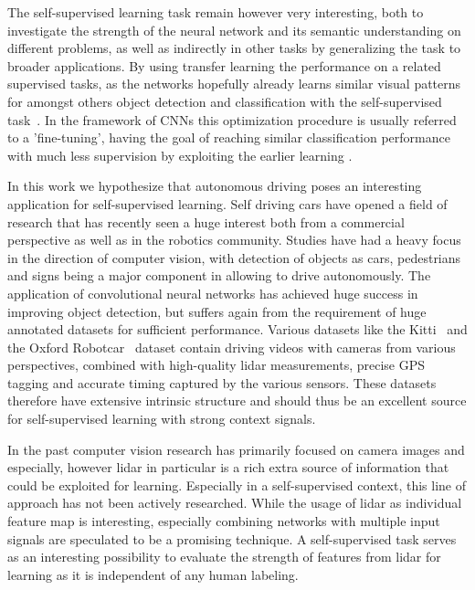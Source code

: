 The self-supervised learning task remain however very interesting, both to investigate the strength of the neural network and its semantic understanding on different problems, as well as indirectly in other tasks by generalizing the task to broader applications. By using transfer learning the performance on a related supervised tasks, as the networks hopefully already learns similar visual patterns for amongst others object detection and classification with the self-supervised task~\cite{raina2007}. In the framework of CNNs this optimization procedure is usually referred to a 'fine-tuning', having the goal of reaching similar classification performance with much less supervision by exploiting the earlier learning \needref.

In this work we hypothesize that autonomous driving poses an interesting application for self-supervised learning. Self driving cars have opened a field of research that has recently seen a huge interest both from a commercial perspective as well as in the robotics community. Studies have had a heavy focus in the direction of computer vision, with detection of objects as cars, pedestrians and signs being a major component in allowing to drive autonomously. The application of convolutional neural networks has achieved huge success in improving object detection\cite{bojarski2016end}, but suffers again from the requirement of huge annotated datasets for sufficient performance. Various datasets like the Kitti~\cite{geiger2012} and the Oxford Robotcar~\cite{maddern2017} dataset contain driving videos with cameras from various perspectives, combined with high-quality lidar measurements, precise GPS tagging and accurate timing captured by the various sensors. These datasets therefore have extensive intrinsic structure and should thus be an excellent source for self-supervised learning with strong context signals. 

In the past computer vision research has primarily focused on camera images and especially, however lidar in particular is a rich extra source of information that could be exploited for learning. Especially in a self-supervised context, this line of approach has not been actively researched. While the usage of lidar as individual feature map is interesting, especially combining networks with multiple input signals are speculated to be a promising technique. A self-supervised task serves as an interesting possibility to evaluate the strength of features from lidar for learning as it is independent of any human labeling.

